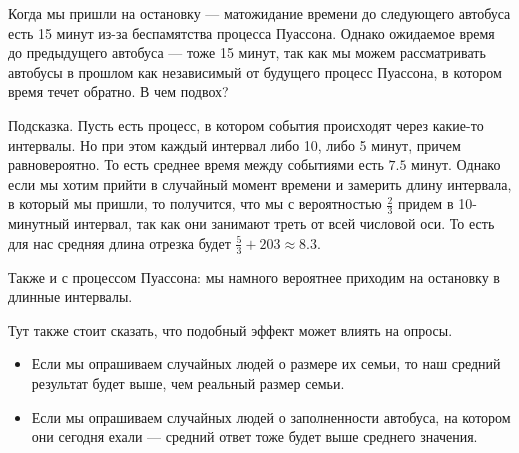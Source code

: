 \documentclass[12pt]{article}
\begin{document}
Когда мы пришли на остановку --- матожидание времени до следующего автобуса есть 15 минут из-за беспамятства процесса Пуассона. Однако ожидаемое время до предыдущего автобуса --- тоже 15 минут, так как мы можем рассматривать автобусы в прошлом как независимый от будущего процесс Пуассона, в котором время течет обратно. В чем подвох?

Подсказка. Пусть есть процесс, в котором события происходят через какие-то интервалы. Но при этом каждый интервал либо 10, либо 5 минут, причем равновероятно. То есть среднее время между событиями есть $7.5$ минут. Однако если мы хотим прийти в случайный момент времени и замерить длину интервала, в который мы пришли, то получится, что мы с вероятностью $\frac{2}{3}$ придем в 10-минутный интервал, так как они занимают треть от всей числовой оси. То есть для нас средняя длина отрезка будет $\frac{5}{3} + {20}{3} \approx 8.3$.

Также и с процессом Пуассона: мы намного вероятнее приходим на остановку в длинные интервалы.

Тут также стоит сказать, что подобный эффект может влиять на опросы.
\begin{itemize}
  \item Если мы опрашиваем случайных людей о размере их семьи, то наш средний результат будет выше, чем реальный размер семьи.
  \item Если мы опрашиваем случайных людей о заполненности автобуса, на котором они сегодня ехали --- средний ответ тоже будет выше среднего значения.
\end{itemize}
\end{document}
